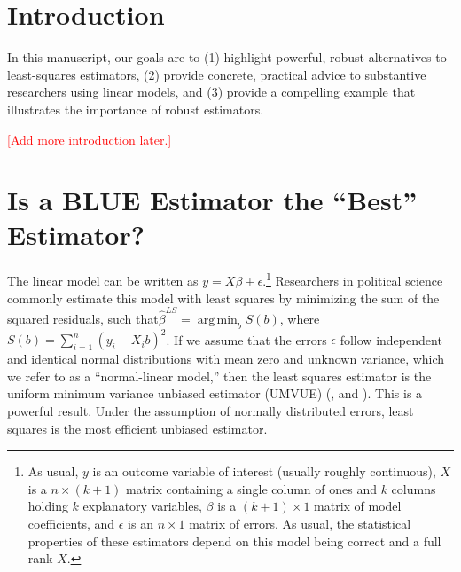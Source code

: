 \documentclass[12pt]{article}
\DeclareMathOperator*{\argmin}{arg\,min}
\newcommand{\ctk}[1]{\textcolor{red}{#1}}
\begin{document}


\thispagestyle{empty}

\newpage
\doublespace

\section*{Introduction}

In this manuscript, our goals are to (1) highlight powerful, robust alternatives to least-squares estimators, (2) provide concrete, practical advice to substantive researchers using linear models, and (3) provide a compelling example that illustrates the importance of robust estimators.

\ctk{[Add more introduction later.]}

\section*{Is a BLUE Estimator the ``Best'' Estimator?}

The linear model can be written as $y = X\beta + \epsilon$.\footnote{As usual, $y$ is an outcome variable of interest (usually roughly continuous), $X$ is a $n \times (k + 1)$ matrix containing a single column of ones and $k$ columns holding $k$ explanatory variables, $\beta$ is a $(k + 1) \times 1$ matrix of model coefficients, and $\epsilon$ is an $n \times 1$ matrix of errors. As usual, the statistical properties of these estimators depend on this model being correct and a full rank $X$.} 
Researchers in political science commonly estimate this model with least squares by minimizing the sum of the squared residuals, such that$\hat{\beta}^{LS} = \argmin_b S(b)$, where $S(b) = \sum_{i = 1}^n(y_i - X_ib)^2$. 
If we assume that the errors $\epsilon$ follow independent and identical normal distributions with mean zero and unknown variance, which we refer to as a ``normal-linear model,'' then the least squares estimator is the uniform minimum variance unbiased estimator (UMVUE) (\citealt[pp. 334-342]{CasellaBerger2002}, and \citealt[807-815]{Wooldridge2013}).
This is a powerful result. 
Under the assumption of normally distributed errors, least squares is the most efficient unbiased estimator.
\end{document}
